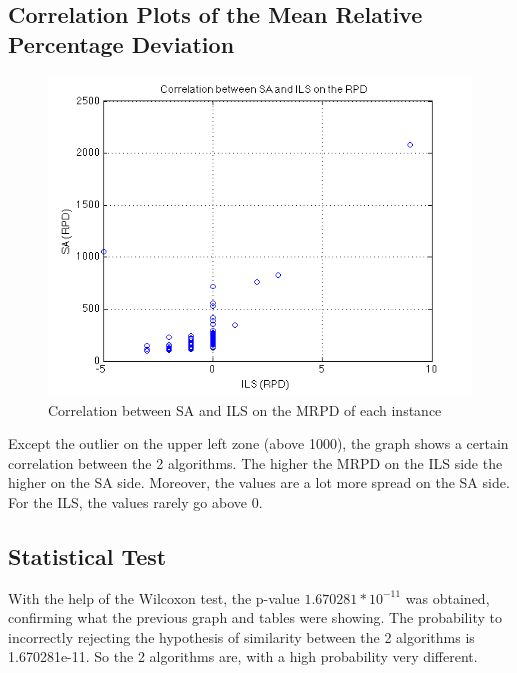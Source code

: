 \subsection{Correlation Plots of the Mean Relative Percentage Deviation}

\begin{figure}[H]
\centering \includegraphics[width=\textwidth]{correlation.png}
\caption{Correlation between SA and ILS on the MRPD of each instance}
\end{figure}

Except the outlier on the upper left zone (above 1000), the graph shows a certain correlation between the 2 algorithms. The higher the MRPD on the ILS side the higher on the SA side. Moreover, the values are a lot more spread on the SA side. For the ILS, the values rarely go above 0.


\subsection{Statistical Test}

With the help of the Wilcoxon test, the p-value $1.670281*10^{-11}$ was obtained, confirming what the previous graph and tables were showing. The probability to incorrectly rejecting the hypothesis of similarity between the 2 algorithms is 1.670281e-11. So the 2 algorithms are, with a high probability very different.

